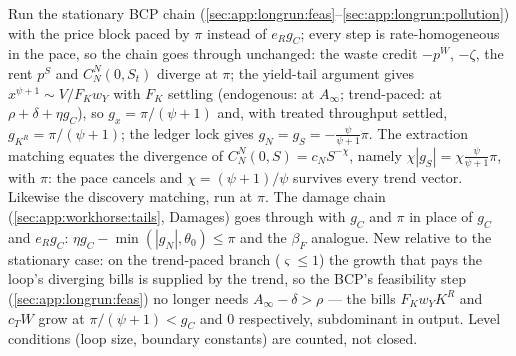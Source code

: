  Run the stationary BCP chain
(\ref{sec:app:longrun:feas}--\ref{sec:app:longrun:pollution}) with the price block paced by
$\pi$ instead of $e_Rg_C$; every step is rate-homogeneous in the pace, so the chain goes
through unchanged: the waste credit $-p^W$, $-\zeta$, the rent $p^S$ and
$C^N_N\left(0,S_t\right)$ diverge at $\pi$; the yield-tail argument gives
$x^{\psi+1}\sim V/F_Kw_Y$ with $F_K$ settling (endogenous: at $A_\infty$; trend-paced: at
$\rho+\delta+\eta g_C$), so $g_x=\pi/\left(\psi+1\right)$ and, with treated throughput
settled, $g_{K^R}=\pi/\left(\psi+1\right)$; the ledger lock gives
$g_N=g_S=-\frac{\psi}{\psi+1}\pi$. The extraction matching equates the divergence of
$C^N_N\left(0,S\right)=c_NS^{-\chi}$, namely $\chi\left|g_S\right|=\chi\frac{\psi}{\psi+1}\pi$,
with $\pi$: the pace cancels and $\chi=\left(\psi+1\right)/\psi$ survives every trend
vector. Likewise the discovery matching, run at $\pi$. The damage chain
(\ref{sec:app:workhorse:tails}, Damages) goes through with $g_C$ and $\pi$ in place of
$g_C$ and $e_Rg_C$: $\eta g_C-\min\left(\left|g_N\right|,\theta_0\right)\le\pi$ and the
$\beta_F$ analogue. New relative to the stationary case: on the trend-paced branch
($\varsigma\le1$) the growth that pays the loop's diverging bills is supplied by the trend,
so the BCP's feasibility step (\ref{sec:app:longrun:feas}) no longer needs
$A_\infty-\delta>\rho$ --- the bills $F_Kw_YK^R$ and $c_TW$ grow at
$\pi/\left(\psi+1\right)<g_C$ and $0$ respectively, subdominant in output. Level
conditions (loop size, boundary constants) are counted, not closed.

